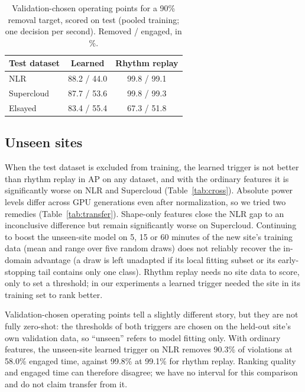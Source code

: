 \documentclass[11pt]{article}
\begin{document}
\begin{table}[t]
\centering
\caption{Validation-chosen operating points for a 90\% removal target, scored on test (pooled training;
one decision per second). Removed / engaged, in \%.}
\label{tab:xready}
\small
\begin{tabular}{@{}lcc@{}}
\toprule
Test dataset & Learned & Rhythm replay \\
\midrule
NLR & 88.2 / 44.0 & 99.8 / 99.1 \\
Supercloud & 87.7 / 53.6 & 99.8 / 99.3 \\
Elsayed & 83.4 / 55.4 & 67.3 / 51.8 \\
\bottomrule
\end{tabular}
\end{table}

\subsection{Unseen sites}
\label{sec:res-unseen}

When the test dataset is excluded from training, the learned trigger is not better than rhythm replay in
AP on any dataset, and with the ordinary features it is significantly worse on NLR and Supercloud
(Table~\ref{tab:cross}). Absolute power levels differ across GPU generations even after normalization, so
we tried two remedies (Table~\ref{tab:transfer}). Shape-only features close the NLR gap to an
inconclusive difference but remain significantly worse on Supercloud. Continuing to boost the unseen-site
model on 5, 15 or 60 minutes of the new site's training data (mean and range over five random draws)
does not reliably recover the in-domain advantage (a draw is left unadapted if its local fitting subset
or its early-stopping tail contains only one class). Rhythm replay needs no site data to score, only to set a
threshold; in our experiments a learned trigger needed the site in its training set to rank better.

Validation-chosen operating points tell a slightly different story, but they are not fully zero-shot:
the thresholds of both triggers are chosen on the held-out site's own validation data, so ``unseen''
refers to model fitting only. With ordinary features, the unseen-site learned trigger on NLR removes 90.3\% of violations at
58.0\% engaged time, against 99.8\% at
99.1\% for rhythm replay. Ranking quality and engaged time can therefore
disagree; we have no interval for this comparison and do not claim transfer from it.
\end{document}
